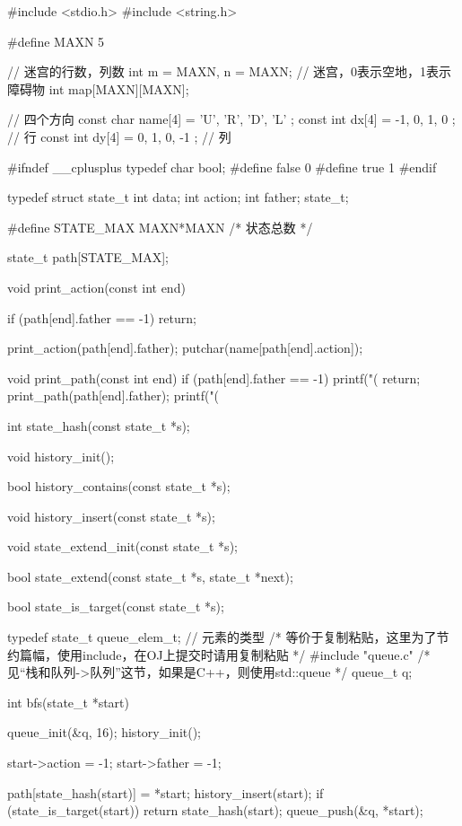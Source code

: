 \begin{Codex}[label=maze.c]
#include <stdio.h>
#include <string.h>

#define MAXN 5

// 迷宫的行数，列数
int m = MAXN, n = MAXN;
// 迷宫，0表示空地，1表示障碍物
int map[MAXN][MAXN];

// 四个方向
const char name[4] = { 'U', 'R', 'D', 'L' };
const int dx[4] = { -1, 0, 1, 0 }; // 行
const int dy[4] = { 0, 1, 0, -1 }; // 列

#ifndef __cplusplus
typedef char bool;
#define false 0
#define true 1
#endif

typedef struct state_t {
    int data;
    int action;
    int father;
} state_t;

#define STATE_MAX MAXN*MAXN  /* 状态总数 */

state_t path[STATE_MAX];

void print_action(const int end) {
    if (path[end].father == -1) return;

    print_action(path[end].father);
    putchar(name[path[end].action]);
}

void print_path(const int end) {
    if (path[end].father == -1) {
        printf("(%
        return;
    }
    print_path(path[end].father);
    printf("(%
}

int state_hash(const state_t *s);

void history_init();

bool history_contains(const state_t *s);

void history_insert(const state_t *s);

void state_extend_init(const state_t *s);

bool state_extend(const state_t *s, state_t *next);

bool state_is_target(const state_t *s);

typedef state_t queue_elem_t; // 元素的类型
/* 等价于复制粘贴，这里为了节约篇幅，使用include，在OJ上提交时请用复制粘贴 */
#include "queue.c"  /* 见“栈和队列->队列”这节，如果是C++，则使用std::queue */
queue_t q;

int bfs(state_t *start) {
    queue_init(&q, 16);
    history_init();

    start->action = -1;
    start->father = -1;

    path[state_hash(start)] = *start;
    history_insert(start);
    if (state_is_target(start))
        return state_hash(start);
    queue_push(&q, *start);

}
\end{Codex}
